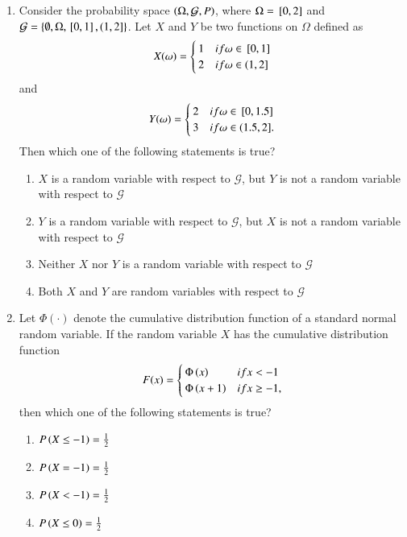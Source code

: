 \documentclass[journal]{IEEEtran}
\begin{document}
\begin{enumerate}
\item Consider the probability space $ \left(\Omega, \mathcal{G}, P\right)$, where $ \Omega = {}\left[0, 2\right]$ and $\mathcal{G} = \left\{ \emptyset, \Omega, {}\left[0, 1\right], (1, 2]\right\}$. Let $X$ and $Y$ be two functions on $\Omega$ defined as 
\begin{align*}
    X(\omega) = \begin{cases} 
      1 & if \omega \in {}\left[0, 1\right] \\ 
      2 & if \omega \in (1, 2] 
   \end{cases}
\end{align*}
and 
\begin{align*}
    Y(\omega) = \begin{cases} 
      2 & if \omega \in {}\left[0, 1.5\right] \\ 
      3 & if \omega \in (1.5, 2]. 
   \end{cases}
\end{align*}
Then which one of the following statements is true?
\begin{enumerate}
    \item $X$ is a random variable with respect to $ \mathcal{G}$, but $Y$ is not a random variable with respect to $ \mathcal{G}$
    \item $Y$ is a random variable with respect to $ \mathcal{G} $, but $X$ is not a random variable with respect to $ \mathcal{G}$
    \item Neither $X$ nor $Y$ is a random variable with respect to $ \mathcal{G} $
    \item Both $X$ and $Y$ are random variables with respect to $\mathcal{G} $
\end{enumerate}

\item Let $ \Phi(\cdot) $ denote the cumulative distribution function of a standard normal random variable. If the random variable $X$ has the cumulative distribution function 
\begin{align*}
F(x) = \begin{cases} 
      \Phi\left(x\right) & if x < -1 \\ 
      \Phi\left(x + 1\right) & if x \geq -1, 
   \end{cases}
\end{align*}
then which one of the following statements is true?
\begin{enumerate}
    \item $ P\left(X \leq -1\right) = \frac{1}{2} $
    \item $ P\left(X = -1\right) = \frac{1}{2} $
    \item $ P\left(X < -1\right) = \frac{1}{2} $
    \item $ P\left(X \leq 0\right) = \frac{1}{2} $
\end{enumerate}


\end{enumerate}
\end{document}
